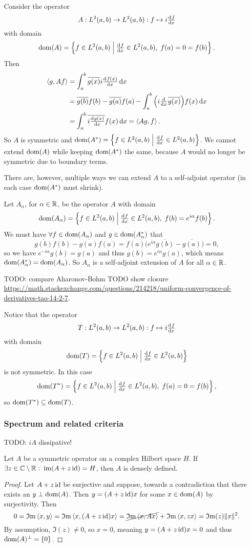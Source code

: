 \begin{example}
Consider the operator
\[ A: L^2(a,b) \to L^2(a,b): f\mapsto i\od{f}{x} \]
with domain
\[ \dom(A) = \setbuilder{f\in L^2(a,b)}{\od{f}{x}\in L^2(a,b),\; f(a) = 0 = f(b)}. \]
Then
\begin{align*}
\inner{g, Af} &= \int_{a}^b \overline{g(x)}i\od{f(x)}{x}\diff{x} \\
&= \overline{g(b)}f(b) - \overline{g(a)}f(a) - \int_{a}^b \Big(i \od{}{x}\overline{g(x)}\Big)f(x)\diff{x} \\
&= \int_a^b \overline{i \od{g(x)}{x}} f(x) \diff{x} = \inner{Ag, f}.
\end{align*}
So $A$ is symmetric and $\dom(A^*) = \setbuilder{f\in L^2(a,b)}{\od{f}{x}\in L^2(a,b)}$. We cannot extend $\operatorname{dom}(A)$ while keeping $\operatorname{dom}(A^*)$ the same, because $A$ would no longer be symmetric due to boundary terms.

There are, however, multiple ways we can extend $A$ to a self-adjoint operator (in each case $\operatorname{dom}(A^*)$ must shrink).

Let $A_\alpha$, for $\alpha\in \mathbb{R}$, be the operator $A$ with domain
\[ \dom(A_\alpha) = \setbuilder{f\in L^2(a,b)}{\od{f}{x}\in L^2(a,b),\; f(b) = e^{i\alpha}f(b)}. \]
We must have $\forall f\in \operatorname{dom}(A_\alpha)$ and $g\in\operatorname{dom}(A^*_\alpha)$ that
\[ \overline{g(b)}f(b) - \overline{g(a)}f(a) = f(a)\Big(e^{i\alpha}\overline{g(b)} - \overline{g(a)}\Big) = 0, \]
so we have $e^{-i\alpha}g(b) = g(a)$ and thus $g(b) = e^{i\alpha}g(a)$, which means $\operatorname{dom}(A_\alpha^*) = \operatorname{dom}(A_\alpha)$. So $A_\alpha$ is a self-adjoint extension of $A$ for all $\alpha\in \mathbb{R}$.

TODO: compare Aharonov-Bohm TODO show closure \url{https://math.stackexchange.com/questions/214218/uniform-convergence-of-derivatives-tao-14-2-7}.
\end{example}
Notice that the operator
\[ T: L^2(a,b) \to L^2(a,b): f\mapsto i\od{f}{x} \]
with domain
\[ \dom(T) = \setbuilder{f\in L^2(a,b)}{\od{f}{x}\in L^2(a,b)} \]
is not symmetric. In this case
\[  \dom(T^*) = \setbuilder{f\in L^2(a,b)}{\od{f}{x}\in L^2(a,b),\; f(a)=0=f(b)}, \]
so $\operatorname{dom}(T^*) \subseteq \operatorname{dom}(T)$.

\subsubsection{Spectrum and related criteria}
TODO: $iA$ dissipative!
\begin{lemma}
Let $A$ be a symmetric operator on a complex Hilbert space $H$. If $\exists z \in \mathbb{C}\setminus\mathbb{R}: \; \operatorname{im}(A+z\operatorname{id}) = H$, then $A$ is densely defined.
\end{lemma}
\begin{proof}
Let $A+z\operatorname{id}$ be surjective and suppose, towards a contradiction that there exists an $y\perp \operatorname{dom}(A)$. Then $y = (A+z\operatorname{id})x$ for some $x\in\operatorname{dom}(A)$ by surjectivity. Then
\[ 0 = \operatorname{\mathfrak{I}m}\left\langle x,y \right\rangle = \operatorname{\mathfrak{I}m}\left\langle x, (A+z\operatorname{id})x \right\rangle = \cancel{\operatorname{\mathfrak{I}m}\left\langle x,Ax \right\rangle} + \operatorname{\mathfrak{I}m} \left\langle x,zx \right\rangle = \operatorname{\mathfrak{I}m}(z)\lVert x\rVert^2. \]
By assumption, $\Im(z) \neq 0$, so $x=0$, meaning $y = (A+z\operatorname{id})x = 0$ and thus $\operatorname{dom}(A)^\perp = \{0\}$.
\end{proof}

